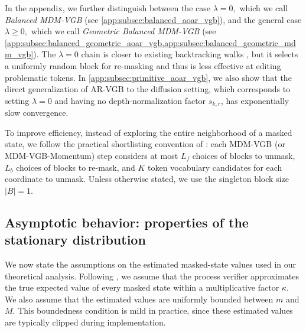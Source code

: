 \documentclass{article}
\numberwithin{theorem}{section}
\numberwithin{proposition}{section}
\numberwithin{corollary}{section}
\numberwithin{lemma}{section}
\numberwithin{conjecture}{section}
\numberwithin{remark}{section}
\numberwithin{definition}{section}
\numberwithin{assumption}{section}
\numberwithin{example}{section}
\begin{document}
In the appendix, we further distinguish between the case $\lambda = 0,$ which we call \emph{Balanced MDM-VGB} (see \cref{app:subsec:balanced_aoar_vgb}), and the general case $\lambda \geq 0,$ which we call \emph{Geometric Balanced MDM-VGB} (see \cref{app:subsec:balanced_geometric_aoar_vgb,app:subsec:balanced_geometric_mdm_vgb}). The $\lambda =0$ chain is closer to existing backtracking walks \cite{sinclair1989approximate,rohatgi2025taming}, but it selects a uniformly random block for re-masking and thus is less effective at editing problematic tokens. In \cref{app:subsec:primitive_aoar_vgb}, we also show that the direct generalization of AR-VGB to the diffusion setting, which corresponds to setting $\lambda=0$ and having no depth-normalization factor $s_{k,r}$, has exponentially slow convergence.

\begin{remark}
To improve efficiency, instead of exploring the entire neighborhood of a masked state, we follow the practical shortlisting convention of \citet{rohatgi2025taming}: each MDM-VGB (or MDM-VGB-Momentum) step considers at most \(L_f\)
choices of blocks to unmask, \(L_b\) choices of blocks to re-mask, and \(K\) token vocabulary candidates for each coordinate to unmask. Unless otherwise stated, we use the
singleton block size \(|B|=1\). 
\end{remark}

\vspace{-8pt}
\subsection{Asymptotic behavior: properties of the stationary distribution}


\vspace{-5pt}
We now state the assumptions on the estimated masked-state values used in our theoretical analysis. Following
\citet{rohatgi2025taming}, we assume that the process verifier
approximates the true expected value of every masked state within
a multiplicative factor \(\kappa\). We also assume that the estimated values are
uniformly bounded between \(m\) and \(M\). This boundedness condition is mild in
practice, since these estimated values are typically clipped during implementation.
\end{document}
